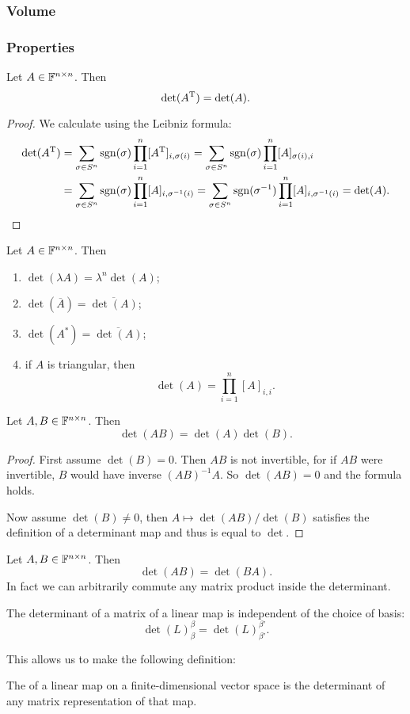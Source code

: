 \subsubsection{Volume}

\subsubsection{Properties}
\begin{lemma}
Let $A\in\mathbb{F}^{n\times n}$. Then
\[ \det(A^{\mathrm{T}}) = \det(A). \]
\end{lemma}
\begin{proof}
We calculate using the Leibniz formula:
\begin{align*}
\det(A^{\mathrm{T}}) &= \sum_{\sigma\in S^n}\operatorname{sgn}(\sigma)\prod_{i=1}^n[A^{\mathrm{T}}]_{i,\sigma(i)} = \sum_{\sigma\in S^n}\operatorname{sgn}(\sigma)\prod_{i=1}^n[A]_{\sigma(i),i} \\
&= \sum_{\sigma\in S^n}\operatorname{sgn}(\sigma)\prod_{i=1}^n[A]_{i,\sigma^{-1}(i)} = \sum_{\sigma\in S^n}\operatorname{sgn}(\sigma^{-1})\prod_{i=1}^n[A]_{i,\sigma^{-1}(i)} = \det(A).
\end{align*}
\end{proof}

\begin{lemma}
Let $A\in\mathbb{F}^{n\times n}$. Then
\begin{enumerate}
\item $\det(\lambda A) = \lambda^n\det(A)$;
\item $\det(\overline{A}) = \overline{\det(A)}$;
\item $\det(A^*) = \overline{\det(A)}$;
\item if $A$ is triangular, then
\[ \det(A) = \prod_{i=1}^n [A]_{i,i}. \]
\end{enumerate}
\end{lemma}

\begin{proposition}
Let $A,B\in\mathbb{F}^{n\times n}$. Then
\[ \det(AB) = \det(A)\det(B). \]
\end{proposition}
\begin{proof}
First assume $\det(B) = 0$. Then $AB$ is not invertible, for if $AB$ were invertible, $B$ would have inverse $(AB)^{-1}A$. So $\det(AB) = 0$ and the formula holds.

Now assume $\det(B) \neq 0$, then $A\mapsto \det(AB)/\det(B)$ satisfies the definition of a determinant map and thus is equal to $\det$.
\end{proof}
\begin{corollary}
Let $A,B\in\mathbb{F}^{n\times n}$. Then
\[ \det(AB) = \det(BA). \]
In fact we can arbitrarily commute any matrix product inside the determinant.
\end{corollary}
\begin{corollary}
The determinant of a matrix of a linear map is independent of the choice of basis:
\[ \det(L)_{\beta}^{\beta} = \det(L)_{\beta'}^{\beta'}. \]
\end{corollary}
This allows us to make the following definition:
\begin{definition}
The  of a linear map on a finite-dimensional vector space is the determinant of any matrix representation of that map.
\end{definition}

